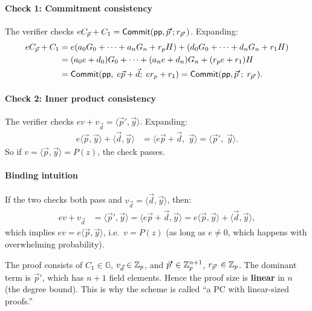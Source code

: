 \documentclass[11pt]{article}
\begin{document}
\paragraph{Check 1: Commitment consistency}

The verifier checks $eC_{\vec{p}} + C_1 = \mathsf{Commit}(\mathsf{pp}, \vec{p}'; r_{\vec{p}'})$.  Expanding:
\begin{align*}
  eC_{\vec{p}} + C_1
  &= e(a_0 G_0 + \cdots + a_n G_n + r_p H) + (d_0 G_0 + \cdots + d_n G_n + r_1 H) \\
  &= (a_0 e + d_0) G_0 + \cdots + (a_n e + d_n) G_n + (r_p e + r_1) H \\
  &= \mathsf{Commit}(\mathsf{pp},\; e\vec{p} + \vec{d};\; er_p + r_1)
   = \mathsf{Commit}(\mathsf{pp}, \vec{p}';\; r_{\vec{p}'}).
\end{align*}

\paragraph{Check 2: Inner product consistency}

The verifier checks $ev + v_{\vec{d}} = \langle \vec{p}', \vec{y} \rangle$.  Expanding:
\begin{align*}
  e \langle \vec{p}, \vec{y} \rangle + \langle \vec{d}, \vec{y} \rangle
  &= \langle e\vec{p} + \vec{d},\; \vec{y} \rangle
   = \langle \vec{p}',\; \vec{y} \rangle.
\end{align*}
So if $v = \langle \vec{p}, \vec{y} \rangle = P(z)$, the check passes.

\paragraph{Binding intuition}

If the two checks both pass and $v_{\vec{d}} = \langle \vec{d}, \vec{y} \rangle$, then:
\begin{align*}
  ev + v_{\vec{d}} &= \langle \vec{p}', \vec{y} \rangle = \langle e\vec{p} + \vec{d}, \vec{y} \rangle
                    = e \langle \vec{p}, \vec{y} \rangle + \langle \vec{d}, \vec{y} \rangle,
\end{align*}
which implies $ev = e \langle \vec{p}, \vec{y} \rangle$, i.e.\ $v = P(z)$ (as long as $e \neq 0$, which happens with overwhelming probability).

\begin{remark}
The proof consists of $C_1 \in \mathbb{G}$, $v_{\vec{d}} \in \mathbb{Z}_p$, and $\vec{p}' \in \mathbb{Z}_p^{n+1}$, $r_{\vec{p}'} \in \mathbb{Z}_p$.  The dominant term is $\vec{p}'$, which has $n+1$ field elements.  Hence the proof size is \textbf{linear} in $n$ (the degree bound).  This is why the scheme is called ``a PC with linear-sized proofs.''
\end{remark}
\end{document}
